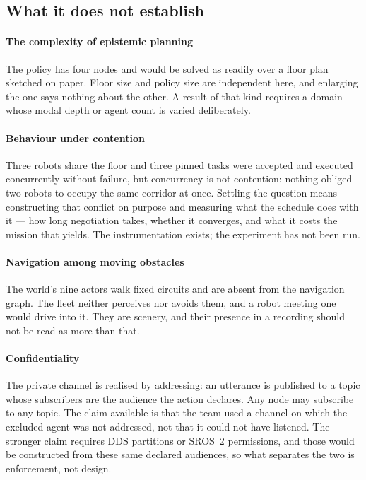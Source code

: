 \documentclass[11pt,a4paper]{article}
\theoremstyle{definition}
\begin{document}
\subsection{What it does not establish}

\paragraph{The complexity of epistemic planning} The policy has four nodes and
would be solved as readily over a floor plan sketched on paper. Floor size and
policy size are independent here, and enlarging the one says nothing about the
other. A result of that kind requires a domain whose modal depth or agent count
is varied deliberately.

\paragraph{Behaviour under contention} Three robots share the floor and three
pinned tasks were accepted and executed concurrently without failure, but
concurrency is not contention: nothing obliged two robots to occupy the same
corridor at once. Settling the question means constructing that conflict on
purpose and measuring what the schedule does with it --- how long negotiation
takes, whether it converges, and what it costs the mission that yields. The
instrumentation exists; the experiment has not been run.

\paragraph{Navigation among moving obstacles} The world's nine actors walk fixed
circuits and are absent from the navigation graph. The fleet neither perceives
nor avoids them, and a robot meeting one would drive into it. They are scenery,
and their presence in a recording should not be read as more than that.

\paragraph{Confidentiality} The private channel is realised by addressing: an
utterance is published to a topic whose subscribers are the audience the action
declares. Any node may subscribe to any topic. The claim available is that the
team used a channel on which the excluded agent was not addressed, not that it
could not have listened. The stronger claim requires DDS partitions or SROS~2
permissions, and those would be constructed from these same declared audiences,
so what separates the two is enforcement, not design.
\end{document}
